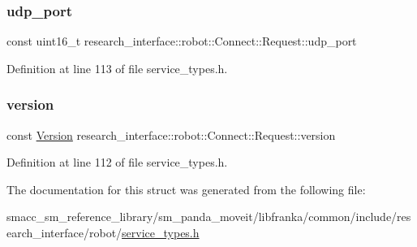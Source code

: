 \subsubsection{\texorpdfstring{udp\+\_\+port}{udp\_port}}
{\footnotesize\ttfamily const uint16\+\_\+t research\+\_\+interface\+::robot\+::\+Connect\+::\+Request\+::udp\+\_\+port}



Definition at line 113 of file service\+\_\+types.\+h.

\mbox{\label{structresearch__interface_1_1robot_1_1Connect_1_1Request_a006e8004379eb2b329bb9388c76a5399}} 
\subsubsection{\texorpdfstring{version}{version}}
{\footnotesize\ttfamily const \hyperlink{namespaceresearch__interface_1_1robot_aa7a53d2c58ee4f7aa706b905ddcc7d47}{Version} research\+\_\+interface\+::robot\+::\+Connect\+::\+Request\+::version}



Definition at line 112 of file service\+\_\+types.\+h.



The documentation for this struct was generated from the following file\+:\begin{DoxyCompactItemize}
\item 
smacc\+\_\+sm\+\_\+reference\+\_\+library/sm\+\_\+panda\+\_\+moveit/libfranka/common/include/research\+\_\+interface/robot/\hyperlink{service__types_8h}{service\+\_\+types.\+h}\end{DoxyCompactItemize}

